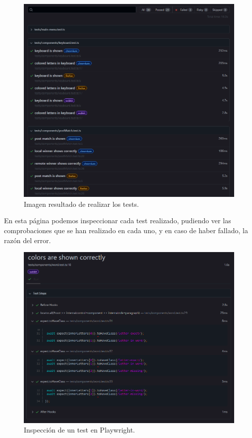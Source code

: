\begin{figure}[H]
	\centering
	\includegraphics[clip=true, width=\textwidth]{images/tests/playwright_web.png}
	\caption{Imagen resultado de realizar los tests.}
	\label{fig:playwright_tests_result}
\end{figure}

En esta página  podemos inspeccionar cada test realizado, pudiendo ver las comprobaciones que se han realizado en cada uno, y en caso de haber fallado, la razón del error.

\begin{figure}[H]
	\centering
	\includegraphics[clip=true, width=\textwidth]{images/tests/playwright_one_test.png}
	\caption{Inspección de un test en Playwright.}
	\label{fig:playwright_test_result}
\end{figure}

